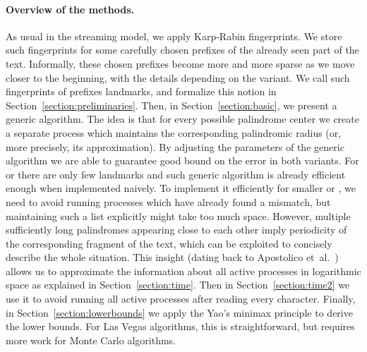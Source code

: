 \documentclass{article}[11pt,letter]
\newcommand{\etal}{et~al.}
\begin{document}
\paragraph{Overview of the methods.} As usual in the streaming model, we apply Karp-Rabin fingerprints. We store
such fingerprints for some carefully chosen prefixes of the already seen part of the text. Informally, these chosen
prefixes become more and more sparse as we move closer to the beginning, with the details depending on the
variant. We call such fingerprints of prefixes landmarks, and formalize this notion in Section~\ref{section:preliminaries}. Then, in Section~\ref{section:basic}, we present
a generic algorithm. The idea is that for every possible palindrome center we create a separate process
which maintains the corresponding palindromic radius (or, more precisely, its approximation).
By adjusting the parameters of the generic algorithm we are able to guarantee good bound on the error
in both variants.
For  or  there are only few landmarks and such generic algorithm
is already efficient enough when implemented naively. To implement it efficiently for smaller 
or , we need to avoid running processes which have already found
a mismatch, but maintaining such a list explicitly might take too much space. However, multiple sufficiently
long palindromes appearing close to each other imply periodicity of the corresponding fragment of the text, which
can be exploited to concisely describe the whole situation.
This insight (dating back to Apostolico \etal~\cite{Apostolico})
allows us to approximate the information about all active processes in logarithmic space as explained
in Section~\ref{section:time}. Then in Section~\ref{section:time2} we use it to avoid running all active processes after
reading every character.
Finally, in Section~\ref{section:lowerbounds} we apply the Yao's minimax principle to derive the
lower bounds. For Las Vegas algorithms, this is straightforward, but requires more work for Monte Carlo algorithms.
\end{document}
